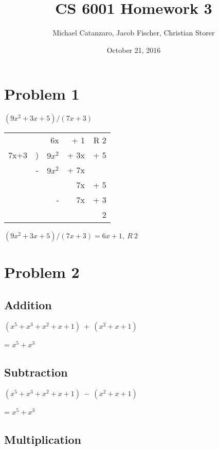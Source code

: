 \documentclass[letterpaper]{article}
\title{CS 6001 Homework 3}
\author{Michael Catanzaro, Jacob Fischer, Christian Storer}
\date{October 21, 2016}
\begin{document}
\maketitle

\section{Problem 1}


\((9x^2+3x+5) / (7x+3)\)

\bigskip

\begin{tabular}{rrrrr}
     &   & 6x       & + 1  & R 2 \\ \hhline{~----}
7x+3 & ) & \(9x^2\) & + 3x & + 5 \\
     & - & \(9x^2\) & + 7x &     \\ \hhline{~~---}
     &   &          & 7x   & + 5 \\
     &   & -        & 7x   & + 3 \\ \hhline{~~~--}
     &   &          &      & 2 
\end{tabular}

\((9x^2+3x+5) / (7x+3) = 6x + 1,\ R\ 2\)


\section{Problem 2}

\subsection{Addition}

\((x^5 + x^3 + x^2 + x + 1)\ +\ (x^2 + x + 1)\)

= \(x^5 + x^3\)

\subsection{Subtraction}

\((x^5 + x^3 + x^2 + x + 1)\ -\ (x^2 + x + 1)\)

= \(x^5 + x^3\)

\subsection{Multiplication}
\end{document}
